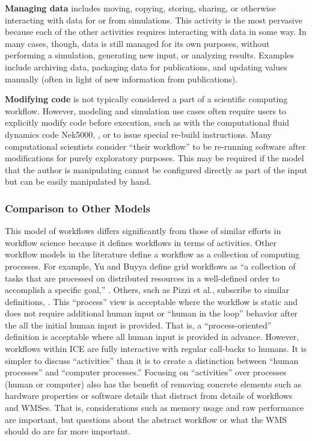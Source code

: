 \textbf{Managing data} includes moving, copying, storing, sharing, or
otherwise interacting with data for or from simulations. This activity
is the most pervasive because each of the other activities requires
interacting with data in some way. In many cases, though, data is still
managed for its own purposes, without performing a simulation,
generating new input, or analyzing results. Examples include archiving
data, packaging data for publications, and updating values manually
(often in light of new information from publications).

\textbf{Modifying code} is not typically considered a part of a
scientific computing workflow. However, modeling and simulation use
cases often require users to explicitly modify code before execution,
such as with the computational fluid dynamics code Nek5000,
\cite{the_nek5000_team_nek5000_2014}, or to issue special re-build instructions.
Many computational scientists consider ``their workflow'' to be re-running
software after modifications for purely exploratory purposes. This may
be required if the model that the author is manipulating cannot be
configured directly as part of the input but can be easily manipulated
by hand.

\subsubsection{Comparison to Other
Models}\label{comparison-to-other-models}

This model of workflows differs significantly from those of similar
efforts in workflow science because it defines workflows in terms of
activities. Other workflow models in the literature define a workflow as
a collection of computing processes. For example, Yu and Buyya define
grid workflows as ``a collection of tasks that are processed on
distributed resources in a well-defined order to accomplish a specific
goal,'' \cite{yu_taxonomy_2005}. Others, such as Pizzi et al., subscribe to
similar definitions, \cite{pizzi_aiida:_2016}. This ``process'' view is
acceptable where the workflow is static and does not require additional
human input or ``human in the loop'' behavior after the all the initial
human input is provided. That is, a ``process-oriented'' definition is
acceptable where all human input is provided in advance. However,
workflows within ICE are fully interactive with regular call-backs to
humans. It is simpler to discuss ``activities'' than it is to create a
distinction between ``human processes'' and ``computer processes.''
Focusing on ``activities'' over processes (human or computer) also has
the benefit of removing concrete elements such as hardware properties or
software details that distract from details of workflows and WMSes. That
is, considerations such as memory usage and raw performance are
important, but questions about the abstract workflow or what the WMS
should do are far more important.


